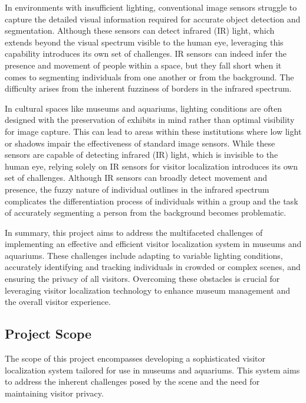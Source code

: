 In environments with insufficient lighting, conventional image sensors struggle to capture the detailed visual information required for accurate object detection and segmentation. Although these sensors can detect infrared (IR) light, which extends beyond the visual spectrum visible to the human eye, leveraging this capability introduces its own set of challenges. IR sensors can indeed infer the presence and movement of people within a space, but they fall short when it comes to segmenting individuals from one another or from the background. The difficulty arises from the inherent fuzziness of borders in the infrared spectrum.

In cultural spaces like museums and aquariums, lighting conditions are often designed with the preservation of exhibits in mind rather than optimal visibility for image capture. This can lead to areas within these institutions where low light or shadows impair the effectiveness of standard image sensors. While these sensors are capable of detecting infrared (IR) light, which is invisible to the human eye, relying solely on IR sensors for visitor localization introduces its own set of challenges. Although IR sensors can broadly detect movement and presence, the fuzzy nature of individual outlines in the infrared spectrum complicates the differentiation process of individuals within a group and the task of accurately segmenting a person from the background becomes problematic.

In summary, this project aims to address the multifaceted challenges of implementing an effective and efficient visitor localization system in museums and aquariums. These challenges include adapting to variable lighting conditions, accurately identifying and tracking individuals in crowded or complex scenes, and ensuring the privacy of all visitors. Overcoming these obstacles is crucial for leveraging visitor localization technology to enhance museum management and the overall visitor experience.

\subsection{Project Scope}

The scope of this project encompasses developing a sophisticated visitor localization system tailored for use in museums and aquariums. This system aims to address the inherent challenges posed by the scene and the need for maintaining visitor privacy.

